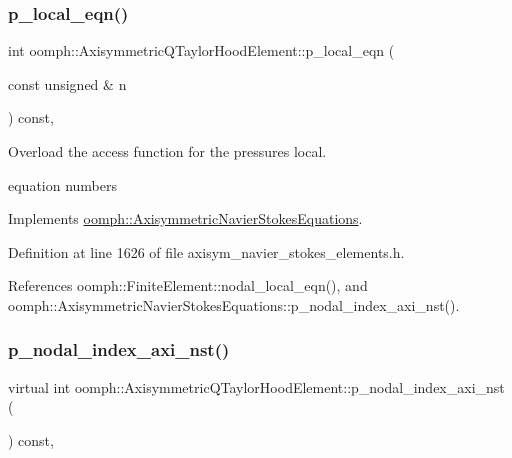 \subsubsection{\texorpdfstring{p\+\_\+local\+\_\+eqn()}{p\_local\_eqn()}}
{\footnotesize\ttfamily int oomph\+::\+Axisymmetric\+Q\+Taylor\+Hood\+Element\+::p\+\_\+local\+\_\+eqn (\begin{DoxyParamCaption}\item[{const unsigned \&}]{n }\end{DoxyParamCaption}) const\hspace{0.3cm}{\ttfamily [inline]}, {\ttfamily [virtual]}}



Overload the access function for the pressure\textquotesingle{}s local. 

equation numbers 

Implements \hyperlink{classoomph_1_1AxisymmetricNavierStokesEquations_ad6ac62ca5fa411c365fd2ecc72aa25e8}{oomph\+::\+Axisymmetric\+Navier\+Stokes\+Equations}.



Definition at line 1626 of file axisym\+\_\+navier\+\_\+stokes\+\_\+elements.\+h.



References oomph\+::\+Finite\+Element\+::nodal\+\_\+local\+\_\+eqn(), and oomph\+::\+Axisymmetric\+Navier\+Stokes\+Equations\+::p\+\_\+nodal\+\_\+index\+\_\+axi\+\_\+nst().

\mbox{\label{classoomph_1_1AxisymmetricQTaylorHoodElement_a318c767e20198f6d3f8a5c788df31055}} 
\subsubsection{\texorpdfstring{p\+\_\+nodal\+\_\+index\+\_\+axi\+\_\+nst()}{p\_nodal\_index\_axi\_nst()}}
{\footnotesize\ttfamily virtual int oomph\+::\+Axisymmetric\+Q\+Taylor\+Hood\+Element\+::p\+\_\+nodal\+\_\+index\+\_\+axi\+\_\+nst (\begin{DoxyParamCaption}{ }\end{DoxyParamCaption}) const\hspace{0.3cm}{\ttfamily [inline]}, {\ttfamily [virtual]}}



